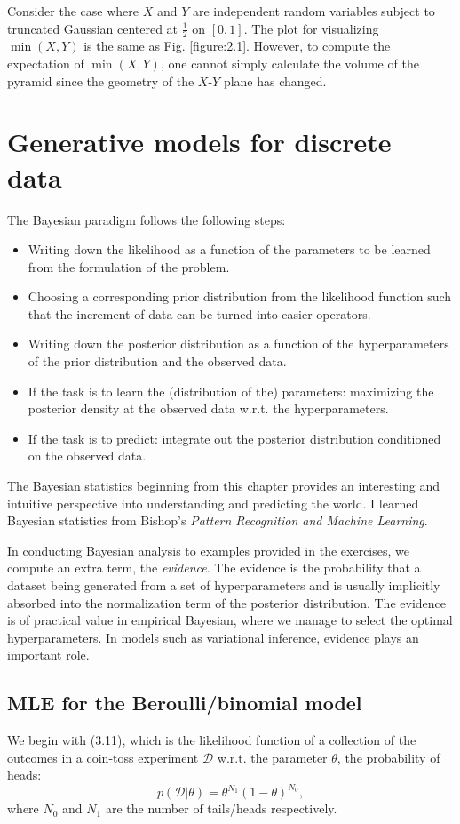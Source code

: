 \documentclass[UTF8]{ctexart}
\begin{document}
Consider the case where $X$ and $Y$ are independent random variables subject to truncated Gaussian centered at $\frac{1}{2}$ on $[0,1]$.
The plot for visualizing $\min(X,Y)$ is the same as Fig. \ref{figure:2.1}.
However, to compute the expectation of $\min(X,Y)$, one cannot simply calculate the volume of the pyramid since the geometry of the $X$-$Y$ plane has changed.



\newpage
\section{Generative models for discrete data}
The Bayesian paradigm follows the following steps:
\begin{itemize}
\item Writing down the likelihood as a function of the parameters to be learned from the formulation of the problem.
\item Choosing a corresponding prior distribution from the likelihood function such that the increment of data can be turned into easier operators.
\item Writing down the posterior distribution as a function of the hyperparameters of the prior distribution and the observed data.
\item If the task is to learn the (distribution of the) parameters: maximizing the posterior density at the observed data w.r.t. the hyperparameters.
\item If the task is to predict: integrate out the posterior distribution conditioned on the observed data.
\end{itemize}
The Bayesian statistics beginning from this chapter provides an interesting and intuitive perspective into understanding and predicting the world.
I learned Bayesian statistics from Bishop's \emph{Pattern Recognition and Machine Learning}.

In conducting Bayesian analysis to examples provided in the exercises, we compute an extra term, the \emph{evidence}.
The evidence is the probability that a dataset being generated from a set of hyperparameters and is usually implicitly absorbed into the normalization term of the posterior distribution.
The evidence is of practical value in empirical Bayesian, where we manage to select the optimal hyperparameters.
In models such as variational inference, evidence plays an important role.

\subsection{MLE for the Beroulli/binomial model}
We begin with (3.11), which is the likelihood function of a collection of the outcomes in a coin-toss experiment $\mathcal{D}$ w.r.t. the parameter $\theta$, the probability of heads:
$$p(\mathcal{D}|\theta) = \theta^{N_{1}}(1-\theta)^{N_{0}},$$
where $N_{0}$ and $N_{1}$ are the number of tails/heads respectively.
\end{document}
